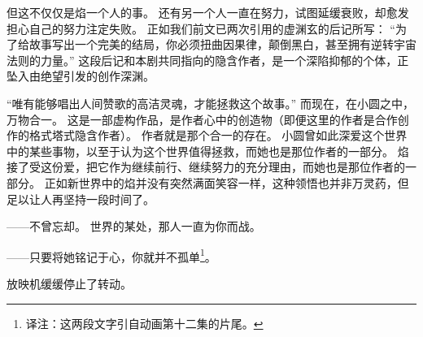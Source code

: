 但这不仅仅是焰一个人的事。
还有另一个人一直在努力，试图延缓衰败，却愈发担心自己的努力注定失败。
正如我们前文已两次引用的虚渊玄的后记所写：
“为了给故事写出一个完美的结局，你必须扭曲因果律，颠倒黑白，甚至拥有逆转宇宙法则的力量。”
\cite{urobuchi2006fate-zero}这段后记和本剧共同指向的隐含作者，是一个深陷抑郁的个体，正坠入由绝望引发的创作深渊。

“唯有能够唱出人间赞歌的高洁灵魂，才能拯救这个故事。”
而现在，在小圆之中，万物合一。
这是一部虚构作品，是作者心中的创造物（即便这里的作者是合作创作的格式塔式隐含作者）。
作者就是那个合一的存在。
小圆曾如此深爱这个世界中的某些事物，以至于认为这个世界值得拯救，而她也是那位作者的一部分。
焰接了受这份爱，把它作为继续前行、继续努力的充分理由，而她也是那位作者的一部分。
正如新世界中的焰并没有突然满面笑容一样，这种领悟也并非万灵药，但足以让人再坚持一段时间了。

——不曾忘却。
世界的某处，那人一直为你而战。

——只要将她铭记于心，你就并不孤单\footnote{%
    译注：这两段文字引自动画第十二集的片尾。
}。

放映机缓缓停止了转动。
